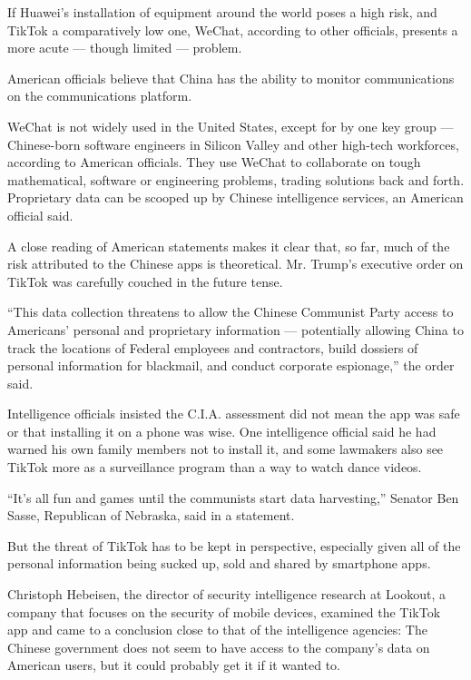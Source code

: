 If Huawei's installation of equipment around the world poses a high
risk, and TikTok a comparatively low one, WeChat, according to other
officials, presents a more acute --- though limited --- problem.

American officials believe that China has the ability to monitor
communications on the communications platform.

WeChat is not widely used in the United States, except for by one key
group --- Chinese-born software engineers in Silicon Valley and other
high-tech workforces, according to American officials. They use WeChat
to collaborate on tough mathematical, software or engineering problems,
trading solutions back and forth. Proprietary data can be scooped up by
Chinese intelligence services, an American official said.

A close reading of American statements makes it clear that, so far, much
of the risk attributed to the Chinese apps is theoretical. Mr. Trump's
executive order on TikTok was carefully couched in the future tense.

``This data collection threatens to allow the Chinese Communist Party
access to Americans' personal and proprietary information ---
potentially allowing China to track the locations of Federal employees
and contractors, build dossiers of personal information for blackmail,
and conduct corporate espionage,'' the order said.

Intelligence officials insisted the C.I.A. assessment did not mean the
app was safe or that installing it on a phone was wise. One intelligence
official said he had warned his own family members not to install it,
and some lawmakers also see TikTok more as a surveillance program than a
way to watch dance videos.

``It's all fun and games until the communists start data harvesting,''
Senator Ben Sasse, Republican of Nebraska, said in a statement.

But the threat of TikTok has to be kept in perspective, especially given
all of the personal information being sucked up, sold and shared by
smartphone apps.

Christoph Hebeisen, the director of security intelligence research at
Lookout, a company that focuses on the security of mobile devices,
examined the TikTok app and came to a conclusion close to that of the
intelligence agencies: The Chinese government does not seem to have
access to the company's data on American users, but it could probably
get it if it wanted to.

